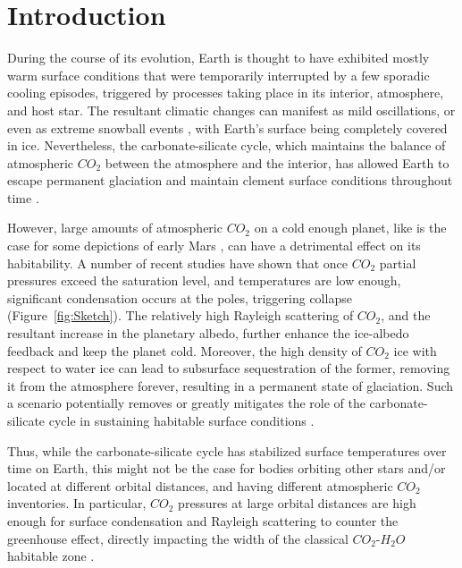 \documentclass[fleqn,usenatbib]{mnras}
\begin{document}


\section{Introduction}

During the course of its evolution, Earth is thought to have exhibited mostly warm surface conditions that were temporarily interrupted by a few sporadic cooling episodes, triggered by processes taking place in its interior, atmosphere, and host star. The resultant climatic changes can manifest as mild oscillations, or even as extreme snowball events \citep{kirschvink1992,Hoffman1342}, with Earth’s surface being completely covered in ice. Nevertheless, the carbonate-silicate cycle, which maintains the balance of atmospheric $CO_{\mathrm{2}}$ between the atmosphere and the interior, has allowed Earth to escape permanent glaciation and maintain clement surface conditions throughout time \citep{Hoffman1342}.

However, large amounts of atmospheric $CO_{\mathrm{2}}$ on a cold enough planet, like is the case for some depictions of early Mars \citep{Kasting1991,wordsworth2013}, can have a detrimental effect on its habitability. A number of recent studies \citep{Kasting1991,Phumbert2005,Phumbert2011, Soto2015, Turbet2017} have shown that once $CO_{\mathrm{2}}$ partial pressures exceed the saturation level, and temperatures are low enough, significant condensation occurs at the poles, triggering collapse (Figure~\ref{fig:Sketch}). The relatively high Rayleigh scattering of $CO_{\mathrm{2}}$, and the resultant increase in the planetary albedo, further enhance the ice-albedo feedback \citep{Kasting1991} and keep the planet cold. Moreover, the high density of $CO_{\mathrm{2}}$ ice with respect to water ice can lead to subsurface sequestration of the former, removing it from the atmosphere forever, resulting in a permanent state of glaciation. Such a scenario potentially removes or greatly mitigates the role of the carbonate-silicate cycle in sustaining habitable surface conditions \citep{Turbet2017}.  

Thus, while the carbonate-silicate cycle has stabilized surface temperatures over time on Earth, this might not be the case for bodies orbiting other stars and/or located at different orbital distances, and having different atmospheric $CO_{\mathrm{2}}$ inventories. In particular, $CO_{\mathrm{2}}$ pressures at large orbital distances are high enough for surface condensation and Rayleigh scattering to counter the greenhouse effect, directly impacting the width of the classical $CO_{\mathrm{2}}$-$H_{\mathrm{2}}O$ habitable zone \citep{kasting1993,KumarKopparapu2013, Ramirez2018}. 
\end{document}
